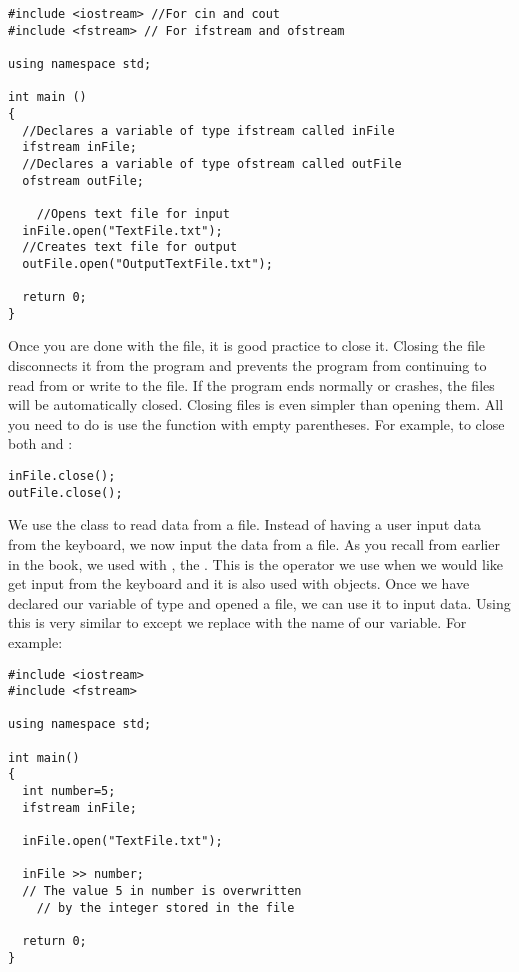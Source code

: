 \noindent\begin{minipage}{\linewidth}\begin{lstlisting}
#include <iostream> //For cin and cout 
#include <fstream> // For ifstream and ofstream
		
using namespace std;
		
int main ()
{
  //Declares a variable of type ifstream called inFile
  ifstream inFile; 
  //Declares a variable of type ofstream called outFile
  ofstream outFile; 
	
	//Opens text file for input
  inFile.open("TextFile.txt"); 
  //Creates text file for output
  outFile.open("OutputTextFile.txt"); 
	
  return 0;
}
\end{lstlisting}\end{minipage}


Once you are done with the file, it is good practice to close it. 
Closing the file disconnects it from the program and prevents the program from continuing to read from or write to the file. 
If the program ends normally or crashes, the files will be automatically closed. 
Closing files is even simpler than opening them. 
All you need to do is use the  function with empty parentheses. 
For example, to close both  and :

\noindent\begin{minipage}{\linewidth}\begin{lstlisting}		
inFile.close();
outFile.close();
\end{lstlisting}\end{minipage}
	

We use the  class to read data from a file. 
Instead of having a user input data from the keyboard, we now input the data from a file. 
As you recall from earlier in the book, we used  with \Code{>>}, the . 
This is the operator we use when we would like get input from the keyboard and it is also used with  objects. 
Once we have declared our variable of type  and opened a file, we can use it to input data. 
Using this is very similar to  except we replace  with the name of our variable.
For example: \nopagebreak[4]

\noindent\begin{minipage}{\linewidth}\begin{lstlisting}		
#include <iostream> 
#include <fstream>
	
using namespace std;

int main()
{
  int number=5;
  ifstream inFile;

  inFile.open("TextFile.txt");

  inFile >> number; 
  // The value 5 in number is overwritten
	// by the integer stored in the file

  return 0;
}
\end{lstlisting}\end{minipage}		

